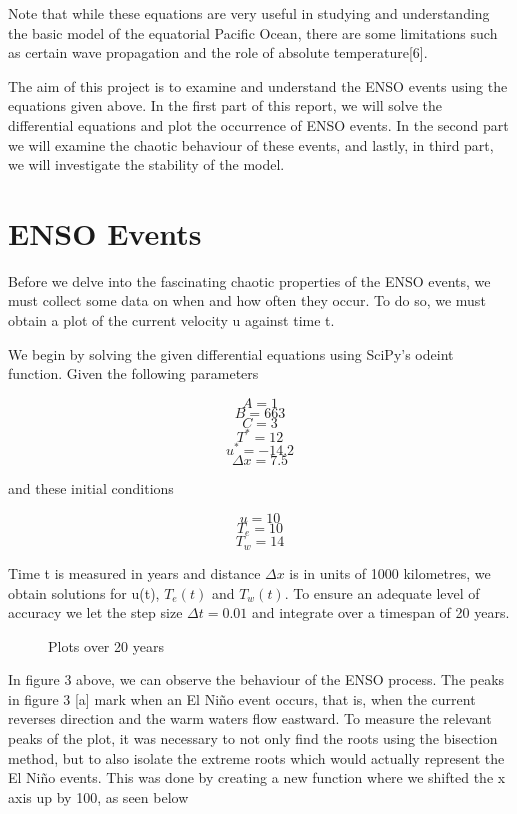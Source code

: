 \documentclass{article}
\begin{document}
Note that while these equations are very useful in studying and understanding the basic model of the equatorial Pacific Ocean, there are some limitations such as certain wave propagation and the role of absolute temperature[6].

The aim of this project is to examine and understand the ENSO events using the equations given above. In the first part of this report, we will solve the differential equations and plot the occurrence of ENSO events. In the second part we will examine the chaotic behaviour of these events, and lastly, in third part, we will investigate the stability of the model. 

\section{ENSO Events}

Before we delve into the fascinating chaotic properties of the ENSO events, we must collect some data on when and how often they occur. To do so, we must obtain a plot of the current velocity u against time t. 

We begin by solving the given differential equations using SciPy’s odeint function. Given the following parameters

$$A = 1$$
$$B = 663$$
$$C = 3$$
$$T^* = 12$$
$$u^* = -14.2$$
$$\Delta x = 7.5 $$

and these initial conditions

$$u = 10$$
$$T_e = 10$$
$$T_w = 14 $$

Time t is measured in years and distance $\Delta x$ is in units of 1000 kilometres, we obtain solutions for u(t), $T_e(t)$ and $T_w(t)$. To ensure an adequate level of accuracy we let the step size $\Delta t =  0.01$ and integrate over a timespan of 20 years. 



\begin{figure}
    \centering
    \qquad
    \caption{Plots over 20 years}%
    \label{fig:example}%
\end{figure}

In figure 3  above, we can observe the behaviour of the ENSO process. The peaks in figure 3 [a] mark when an El Niño event occurs, that is, when the current reverses direction and the warm waters flow eastward. To measure the relevant peaks of the plot, it was necessary to not only find the roots using the bisection method, but to also isolate the extreme roots which would actually represent the El Niño events. This was done by creating a new function where we shifted the x axis up by 100, as seen below
\end{document}
